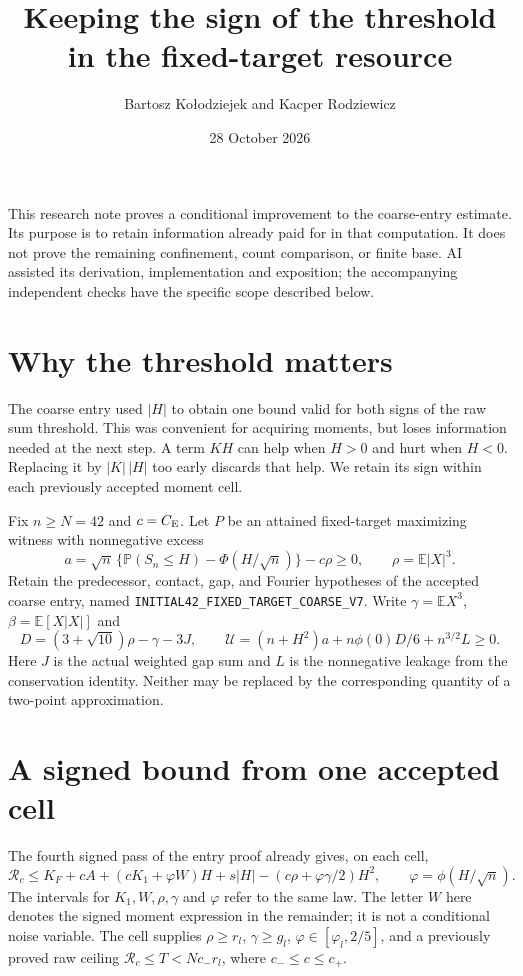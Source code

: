 \documentclass[11pt]{article}
\title{Keeping the sign of the threshold in the fixed-target resource}
\author{Bartosz Ko{\l}odziejek and Kacper Rodziewicz}
\date{28 October 2026}
\newcommand{\E}{\mathbb E}\newcommand{\CE}{C_{\rm E}}
\begin{document}
\maketitle
\noindent This research note proves a conditional improvement to the
coarse-entry estimate. Its purpose is to retain information already paid
for in that computation. It does not prove the remaining confinement,
count comparison, or finite base. AI assisted its derivation, implementation
and exposition; the accompanying independent checks have the specific
scope described below.

\section{Why the threshold matters}
The coarse entry used $|H|$ to obtain one bound valid for both signs of the
raw sum threshold. This was convenient for acquiring moments, but loses
information needed at the next step. A term $KH$ can help when $H>0$
and hurt when $H<0$. Replacing it by $|K|\,|H|$ too early discards that help.
We retain its sign within each previously accepted moment cell.

Fix $n\ge N=42$ and $c=\CE$. Let $P$ be an attained fixed-target maximizing
witness with nonnegative excess
\[
 a=\sqrt n\,\{\mathbb P(S_n\le H)-\Phi(H/\sqrt n)\}-c\rho\ge0,
 \qquad \rho=\E|X|^3.
\]
Retain the predecessor, contact, gap, and Fourier hypotheses of the
accepted coarse entry, named
\texttt{INITIAL42\_FIXED\_TARGET\_COARSE\_V7}.
Write $\gamma=\E X^3$, $\beta=\E[X|X|]$ and
\[
 D=(3+\sqrt{10})\rho-\gamma-3J,\qquad
 \mathcal U=(n+H^2)a+n\phi(0)D/6+n^{3/2}L\ge0.
\]
Here $J$ is the actual weighted gap sum and $L$ is the nonnegative
leakage from the conservation identity. Neither may be replaced by the
corresponding quantity of a two-point approximation.

\section{A signed bound from one accepted cell}
The fourth signed pass of the entry proof already gives, on each cell,
\begin{equation}\label{raw}
 \mathcal R_c\le K_F+cA+(cK_1+\varphi W)H+s|H|
       -(c\rho+\varphi\gamma/2)H^2,
 \qquad \varphi=\phi(H/\sqrt n).
\end{equation}
The intervals for $K_1,W,\rho,\gamma$ and $\varphi$ refer to the same law.
The letter $W$ here denotes the signed moment expression in the
remainder; it is not a conditional noise variable.
The cell supplies $\rho\ge r_l$, $\gamma\ge g_l$,
$\varphi\in[\varphi_l,2/5]$, and a previously proved raw ceiling
$\mathcal R_c\le T<Nc_-r_l$, where $c_-\le c\le c_+$.
\end{document}
